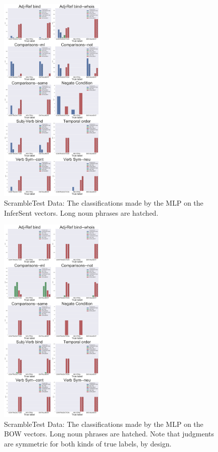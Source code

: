 \documentclass[10pt,letterpaper]{article}
\begin{document}
\begin{figure}[ht!]
\centering
\includegraphics[width=0.45\textwidth]{AllHistsInferSentMLP.png}
\caption{ScrambleTest Data: The classifications made by the MLP on the InferSent vectors. Long noun phrases are hatched.}
\label{fig:IShistMLP}
\end{figure}


\begin{figure}[ht!]
\centering
\includegraphics[width=0.45\textwidth]{AllHistsBOWMLP.png}
\caption{ScrambleTest Data: The classifications made by the MLP on the BOW vectors. Long noun phrases are hatched. Note that judgments are symmetric for both kinds of true labels, by design.}
\label{fig:BOWhistMLP}
\end{figure}
\end{document}
